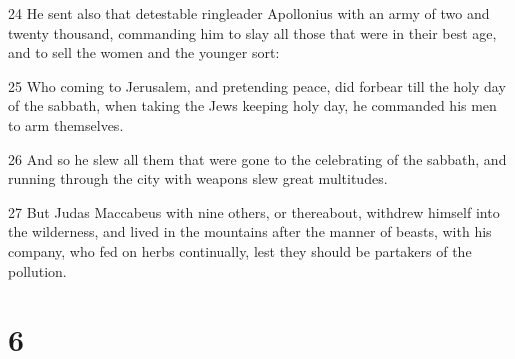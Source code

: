 \par 24 He sent also that detestable ringleader Apollonius with an army of two and twenty thousand, commanding him to slay all those that were in their best age, and to sell the women and the younger sort:
\par 25 Who coming to Jerusalem, and pretending peace, did forbear till the holy day of the sabbath, when taking the Jews keeping holy day, he commanded his men to arm themselves.
\par 26 And so he slew all them that were gone to the celebrating of the sabbath, and running through the city with weapons slew great multitudes.
\par 27 But Judas Maccabeus with nine others, or thereabout, withdrew himself into the wilderness, and lived in the mountains after the manner of beasts, with his company, who fed on herbs continually, lest they should be partakers of the pollution.

\chapter{6}

